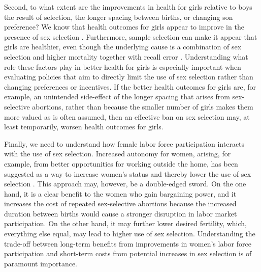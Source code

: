 \documentclass[12pt,letterpaper]{article}
\begin{document}
Second, to what extent are the improvements in health for girls relative to boys the result 
of selection, the longer spacing between births, or changing son preference?
We know that health outcomes for girls appear to improve in the presence of sex selection 
\citep{Lin2014,Hu2015}.
Furthermore, sample selection can make it appear that girls are healthier, even though the 
underlying cause is a combination of sex selection and higher mortality together with 
recall error \citep{Portner2018a}. 
Understanding what role these factors play in better health for girls is especially 
important when evaluating policies that aim to directly limit the use of sex selection 
rather than changing preferences or incentives.
If the better health outcomes for girls are, for example, an unintended side-effect of the 
longer spacing that arises from sex-selective abortions, rather than because the smaller 
number of girls makes them more valued as is often assumed, then an effective ban on sex 
selection may, at least temporarily, worsen health outcomes for girls.

Finally, we need to understand how female labor force participation interacts with the use 
of sex selection.
Increased autonomy for women, arising, for example, from better opportunities for working 
outside the home, has been suggested as a way to increase women's status and thereby lower 
the use of sex selection \citep{Das-Gupta2016}.
This approach may, however, be a double-edged sword.
On the one hand, it is a clear benefit to the women who gain bargaining power, and it 
increases the cost of repeated sex-selective abortions because the increased duration 
between births would cause a stronger disruption in labor market participation.
On the other hand, it may further lower desired fertility, which, everything else equal, 
may lead to higher use of sex selection.
Understanding the trade-off between long-term benefits from improvements in women's labor 
force participation and short-term costs from potential increases in sex selection is of 
paramount importance.


\clearpage

\onehalfspacing






\clearpage
\newpage

\appendix

\renewcommand\thefigure{\thesection.\arabic{figure}}    
\renewcommand\thetable{\thesection.\arabic{table}}    
\end{document}
